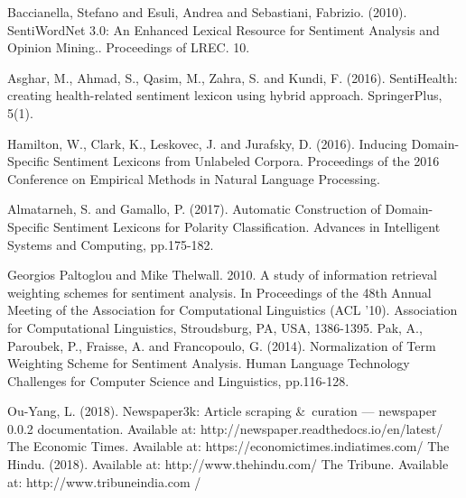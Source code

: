\documentclass[a4paper, 10pt, conference]{ieeeconf}
\begin{document}
\begin{thebibliography}{100}
	Baccianella, Stefano and Esuli, Andrea and Sebastiani, Fabrizio. (2010). SentiWordNet 3.0: An Enhanced Lexical Resource for Sentiment Analysis and Opinion Mining.. Proceedings of LREC. 10.
	
	Asghar, M., Ahmad, S., Qasim, M., Zahra, S. and Kundi, F. (2016). SentiHealth: creating health-related sentiment lexicon using hybrid approach. SpringerPlus, 5(1). 
	
	Hamilton, W., Clark, K., Leskovec, J. and Jurafsky, D. (2016). Inducing Domain-Specific Sentiment Lexicons from Unlabeled Corpora. Proceedings of the 2016 Conference on Empirical Methods in Natural Language Processing.
	
	Almatarneh, S. and Gamallo, P. (2017). Automatic Construction of Domain-Specific Sentiment Lexicons for Polarity Classification. Advances in Intelligent Systems and Computing, pp.175-182.
	
	Georgios Paltoglou and Mike Thelwall. 2010. A study of information retrieval weighting schemes for sentiment analysis. In Proceedings of the 48th Annual Meeting of the Association for Computational Linguistics (ACL '10). Association for Computational Linguistics, Stroudsburg, PA, USA, 1386-1395.
	Pak, A., Paroubek, P., Fraisse, A. and Francopoulo, G. (2014). Normalization of Term Weighting Scheme for Sentiment Analysis. Human Language Technology Challenges for Computer Science and Linguistics, pp.116-128. 
	
	 Ou-Yang, L. (2018). Newspaper3k: Article scraping \&\ curation — newspaper 0.0.2 documentation. Available at: http://newspaper.readthedocs.io/en/latest/
	The Economic Times. Available at: https://economictimes.indiatimes.com/
	The Hindu. (2018). Available at: http://www.thehindu.com/
	The Tribune. Available at: http://www.tribuneindia.com /
	

\end{thebibliography}
\end{document}
